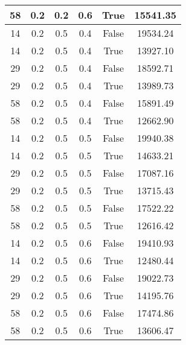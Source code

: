 \documentclass[12pt]{article}
\begin{document}
\begin{table}[h!]
\begin{tabular}{|c|c|c|c|c|c|}
58  &  0.2  &  0.2  &  0.6  &  True  &  15541.35\\ \hline
14  &  0.2  &  0.5  &  0.4  &  False  &  19534.24\\ \hline
14  &  0.2  &  0.5  &  0.4  &  True  &  13927.10\\ \hline
29  &  0.2  &  0.5  &  0.4  &  False  &  18592.71\\ \hline
29  &  0.2  &  0.5  &  0.4  &  True  &  13989.73\\ \hline
58  &  0.2  &  0.5  &  0.4  &  False  &  15891.49\\ \hline
58  &  0.2  &  0.5  &  0.4  &  True  &  12662.90\\ \hline
14  &  0.2  &  0.5  &  0.5  &  False  &  19940.38\\ \hline
14  &  0.2  &  0.5  &  0.5  &  True  &  14633.21\\ \hline
29  &  0.2  &  0.5  &  0.5  &  False  &  17087.16\\ \hline
29  &  0.2  &  0.5  &  0.5  &  True  &  13715.43\\ \hline
58  &  0.2  &  0.5  &  0.5  &  False  &  17522.22\\ \hline
58  &  0.2  &  0.5  &  0.5  &  True  &  12616.42\\ \hline
14  &  0.2  &  0.5  &  0.6  &  False  &  19410.93\\ \hline
14  &  0.2  &  0.5  &  0.6  &  True  &  12480.44\\ \hline
29  &  0.2  &  0.5  &  0.6  &  False  &  19022.73\\ \hline
29  &  0.2  &  0.5  &  0.6  &  True  &  14195.76\\ \hline
58  &  0.2  &  0.5  &  0.6  &  False  &  17474.86\\ \hline
58  &  0.2  &  0.5  &  0.6  &  True  &  13606.47\\ \hline
\end{tabular}
\end{table}
\end{document}
